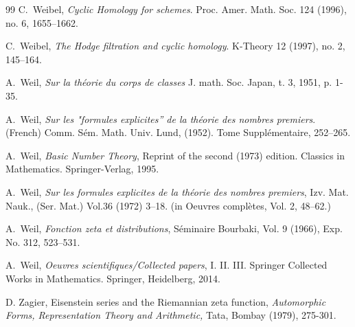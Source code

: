 \documentclass[12pt]{article}
\begin{document}
\begin{thebibliography}{99}
  C.~Weibel, {\em Cyclic Homology for schemes}. Proc. Amer. Math. Soc. 124 (1996), no. 6, 1655--1662.

 C.~Weibel, {\em The Hodge filtration and cyclic homology}.
 K-Theory 12 (1997), no. 2, 145--164.

  A.~Weil, {\em Sur la th\'eorie du corps de classes}  J. math. Soc. Japan, t. 3, 1951, p. 1-35.


 A.~Weil, {\em Sur les "formules explicites'' de la th\'eorie des nombres premiers}. (French) Comm. S\'em. Math. Univ. Lund,  (1952). Tome Suppl\'ementaire, 252--265.


 A.~Weil, {\em Basic Number Theory}, Reprint of the
second (1973) edition. Classics in Mathematics. Springer-Verlag,
1995.

 A.~Weil, {\it Sur les formules explicites de la
th\'eorie des nombres premiers}, Izv. Mat. Nauk., (Ser. Mat.) Vol.36
(1972) 3--18. (in Oeuvres compl\`etes, Vol. 2, 48--62.)


 A.~Weil, {\em
Fonction zeta et distributions}, S\'eminaire Bourbaki, Vol. 9
(1966), Exp. No. 312, 523--531.

 A.~Weil, {\em
 Oeuvres scientifiques/Collected papers}, I. II. III. Springer Collected Works in Mathematics. Springer, Heidelberg, 2014.


\bibitem{[Z]} D. Zagier, Eisenstein series and the Riemannian zeta function, {\it
Automorphic Forms, Representation Theory and Arithmetic,} Tata, Bombay (1979),
275-301.




 \end{thebibliography}
\end{document}
